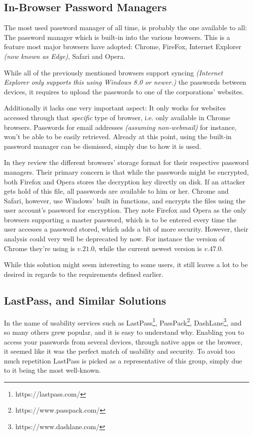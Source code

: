 		\subsection*{In-Browser Password Managers}
			\label{subsec:in-browser}

			The most used password manager of all time, is probably the one available to all: The password manager which is built-in into the various browsers. This is a feature most major browsers have adopted: Chrome, FireFox, Internet Explorer \emph{(now known as Edge)}, Safari and Opera.

			While all of the previously mentioned browsers support syncing \emph{(Internet Explorer only supports this using Windows 8.0 or newer.)} the passwords between devices, it requires to upload the passwords to one of the corporations' websites.

			Additionally it lacks one very important aspect: It only works for websites accessed through that \emph{specific} type of browser, i.e. only available in Chrome browsers. Passwords for email addresses  \emph{(assuming non-webmail)} for instance, won't be able to be easily retrieved. Already at this point, using the built-in password manager can be dismissed, simply due to how it is used.

			In \cite{browser_saved} they review the different browsers' storage format for their respective password managers. Their primary concern is that while the passwords might be encrypted, both Firefox and Opera stores the decryption key directly on disk. If an attacker gets hold of this file, all passwords are available to him or her. Chrome and Safari, however, use Windows' built in functions, and encrypts the files using the user account's password for encryption. They note Firefox and Opera as the only browsers supporting a master password, which is to be entered every time the user accesses a password stored, which adds a bit of more security. However, their analysis could very well be deprecated by now. For instance the version of Chrome they're using is $v. 21.0$, while the current newest version is $v. 47.0$. 

			While this solution might seem interesting to some users, it still leaves a lot to be desired in regards to the requirements defined earlier.

		\subsection*{LastPass, and Similar Solutions}
			\label{subsec:lastpass}
			In the name of usability services such as LastPass\footnote{https://lastpass.com/}, PassPack\footnote{https://www.passpack.com/}, DashLane\footnote{https://www.dashlane.com/}, and so many others grew popular, and it is easy to understand why. Enabling you to access your passwords from several devices, through native apps or the browser, it seemed like it was the perfect match of usability and security. To avoid too much repetition LastPass is picked as a representative of this group, simply due to it being the most well-known.

